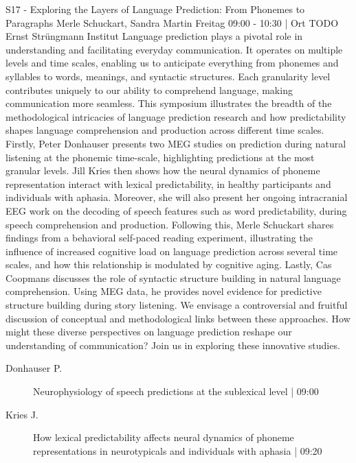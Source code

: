 
            \begin{symposium}
            {S17 - Exploring the Layers of Language Prediction: From Phonemes to Paragraphs}
            {Merle Schuckart, Sandra Martin}
            {Freitag 09:00 - 10:30 | Ort TODO}
            { Ernst Strüngmann Institut}
            Language prediction plays a pivotal role in understanding and facilitating everyday communication. It operates on multiple levels and time scales, enabling us to anticipate everything from phonemes and syllables to words, meanings, and syntactic structures. Each granularity level contributes uniquely to our ability to comprehend language, making communication more seamless. This symposium illustrates the breadth of the methodological intricacies of language prediction research and how predictability shapes language comprehension and production across different time scales.
Firstly, Peter Donhauser presents two MEG studies on prediction during natural listening at the phonemic time-scale, highlighting predictions at the most granular levels. Jill Kries then shows how the neural dynamics of phoneme representation interact with lexical predictability, in healthy participants and individuals with aphasia. Moreover, she will also present her ongoing intracranial EEG work on the decoding of speech features such as word predictability, during speech comprehension and production. Following this, Merle Schuckart shares findings from a behavioral self-paced reading experiment, illustrating the influence of increased cognitive load on language prediction across several time scales, and how this relationship is modulated by cognitive aging. Lastly, Cas Coopmans discusses the role of syntactic structure building in natural language comprehension. Using MEG data, he provides novel evidence for predictive structure building during story listening.
We envisage a controversial and fruitful discussion of conceptual and methodological links between these approaches. How might these diverse perspectives on language prediction reshape our understanding of communication? Join us in exploring these innovative studies.
            \begin{description}    
            
                \item [ Donhauser P.] Neurophysiology of speech predictions at the sublexical level \textcolor{mygray}{ | 09:00}    
                
                \item [ Kries J.] How lexical predictability affects neural dynamics of phoneme representations in neurotypicals and individuals with aphasia \textcolor{mygray}{ | 09:20}    
                

\end{description}
\end{symposium}
